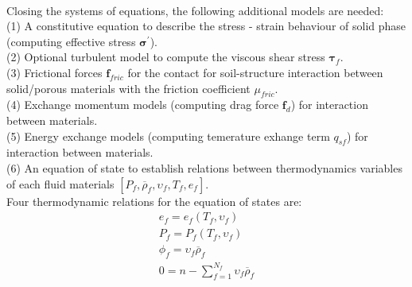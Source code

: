 \documentclass[preprint,12pt]{elsarticle}
\begin{document}
%
%
\underline{\hspace{5in}}\\
Closing the systems of equations, the following additional models are needed: \\
(1) A constitutive equation to describe the stress - strain behaviour of solid phase (computing effective stress $\pmb{\sigma}^\prime$). \\
(2) Optional turbulent model to compute the viscous shear stress $\pmb{\tau}_f$.\\
(3) Frictional forces $\pmb{f}_{fric}$ for the contact for soil-structure interaction between solid/porous materials with the friction coefficient $\mu_{fric}$. \\
(4) Exchange momentum models (computing drag force $\pmb{f}_{d}$) for interaction between materials. \\
(5) Energy exchange models (computing temerature exhange term $q_{sf}$) for interaction between materials. \\
(6) An equation of state to establish relations between thermodynamics variables of each fluid materials $[P_{f}, \overline{\rho}_f, \upsilon_f, T_f, e_f]$. \\
Four thermodynamic relations for the equation of states are:
%
%
\begin{equation}
\begin{gathered}
  e_f =  e_f (T_f, \upsilon_f)\\
 P_f =  P_f(T_f, \upsilon_f)\\
  \phi_f = \upsilon_f \overline{\rho}_f\\
  0 = n - \sum_{f=1}^{N_f} \upsilon_f \overline{\rho}_f\\
\end {gathered}
\end {equation}
%
%
\end{document}
